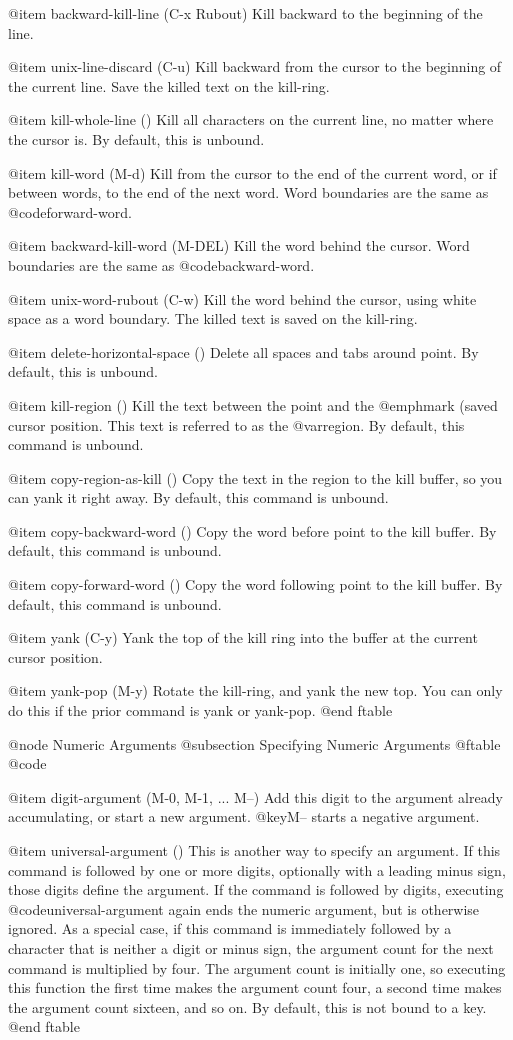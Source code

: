 {{@item backward-kill-line (C-x Rubout)
Kill backward to the beginning of the line.

@item unix-line-discard (C-u)
Kill backward from the cursor to the beginning of the current line.
Save the killed text on the kill-ring.

@item kill-whole-line ()
Kill all characters on the current line, no matter where the
cursor is.  By default, this is unbound.

@item kill-word (M-d)
Kill from the cursor to the end of the current word, or if between
words, to the end of the next word.  Word boundaries are the same
as @code{forward-word}.

@item backward-kill-word (M-DEL)
Kill the word behind the cursor.  Word boundaries are the same
as @code{backward-word}.

@item unix-word-rubout (C-w)
Kill the word behind the cursor, using white space as a word
boundary.  The killed text is saved on the kill-ring.

@item delete-horizontal-space ()
Delete all spaces and tabs around point.  By default, this is unbound.

@item kill-region ()
Kill the text between the point and the @emph{mark} (saved
cursor position.  This text is referred to as the @var{region}.
By default, this command is unbound.

@item copy-region-as-kill ()
Copy the text in the region to the kill buffer, so you can yank it
right away.  By default, this command is unbound.

@item copy-backward-word ()
Copy the word before point to the kill buffer.
By default, this command is unbound.

@item copy-forward-word ()
Copy the word following point to the kill buffer.
By default, this command is unbound.

@item yank (C-y)
Yank the top of the kill ring into the buffer at the current
cursor position.

@item yank-pop (M-y)
Rotate the kill-ring, and yank the new top.  You can only do this if
the prior command is yank or yank-pop.
@end ftable

@node Numeric Arguments
@subsection Specifying Numeric Arguments
@ftable @code

@item digit-argument (M-0, M-1, ... M--)
Add this digit to the argument already accumulating, or start a new
argument.  @key{M--} starts a negative argument.

@item universal-argument ()
This is another way to specify an argument.
If this command is followed by one or more digits, optionally with a
leading minus sign, those digits define the argument.
If the command is followed by digits, executing @code{universal-argument}
again ends the numeric argument, but is otherwise ignored.
As a special case, if this command is immediately followed by a
character that is neither a digit or minus sign, the argument count
for the next command is multiplied by four.
The argument count is initially one, so executing this function the
first time makes the argument count four, a second time makes the
argument count sixteen, and so on.
By default, this is not bound to a key.
@end ftable

}}
